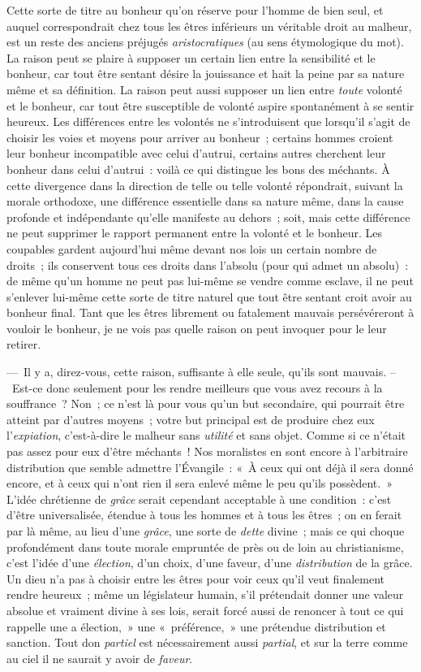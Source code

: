 \documentclass[french,twoside]{book} %
\begin{document}
Cette sorte de titre au bonheur qu’on réserve pour l’homme de bien seul, et auquel correspondrait chez tous les êtres inférieurs un véritable droit au malheur, est un reste des anciens préjugés \emph{aristocratiques} (au sens étymologique du mot). La raison peut se plaire à supposer un certain lien entre la sensibilité et le bonheur, car tout être sentant désire la jouissance et hait la peine par sa nature même et sa définition. La raison peut aussi supposer un lien entre \emph{toute} volonté et le bonheur, car tout être susceptible de volonté aspire spontanément à se sentir heureux. Les différences entre les volontés ne s’introduisent que lorsqu’il s’agit de choisir les voies et moyens pour arriver au bonheur ; certains hommes croient leur bonheur incompatible avec celui d’autrui, certains autres cherchent leur bonheur dans celui d’autrui : voilà ce qui distingue les bons des méchants. À cette divergence dans la direction de telle ou telle volonté répondrait, suivant la morale orthodoxe, une différence essentielle dans sa nature même, dans la cause profonde et indépendante qu’elle manifeste au dehors ; soit, mais cette différence ne peut supprimer le rapport permanent entre la volonté et le bonheur. Les coupables gardent aujourd’hui même devant nos lois un certain nombre de droits ; ils conservent tous ces droits dans l’absolu (pour qui admet un absolu) : de même qu’un homme ne peut pas lui-même se vendre comme esclave, il ne peut s’enlever lui-même cette sorte de titre naturel que tout être sentant croit avoir au bonheur final. Tant que les êtres librement ou fatalement mauvais persévéreront à vouloir le bonheur, je ne vois pas quelle raison on peut invoquer pour le leur retirer.\par
— Il y a, direz-vous, cette raison, suffisante à elle seule, qu’ils sont mauvais. – Est-ce donc seulement pour les rendre meilleurs que vous avez recours à la souffrance ? Non ; ce n’est là pour vous qu’un but secondaire, qui pourrait être atteint par d’autres moyens ; votre but principal est de produire chez eux l’\emph{expiation}, c’est-à-dire le malheur sans \emph{utilité} et sans objet. Comme si ce n’était pas assez pour eux d’être méchants ! Nos moralistes en sont encore à l’arbitraire distribution que semble admettre l’Évangile : « À ceux qui ont déjà il sera donné encore, et à ceux qui n’ont rien il sera enlevé même le peu qu’ils possèdent. » L’idée chrétienne de \emph{grâce} serait cependant acceptable à une condition : c’est d’être universalisée, étendue à tous les hommes et à tous les êtres ; on en ferait par là même, au lieu d’une \emph{grâce}, une sorte de \emph{dette} divine ; mais ce qui choque profondément dans toute morale empruntée de près ou de loin au christianisme, c’est l’idée d’une \emph{élection}, d’un choix, d’une faveur, d’une \emph{distribution} de la grâce. Un dieu n’a pas à choisir entre les êtres pour voir ceux qu’il veut finalement rendre heureux ; même un législateur humain, s’il prétendait donner une valeur absolue et vraiment divine à ses lois, serait forcé aussi de renoncer à tout ce qui rappelle une a élection, » une « préférence, » une prétendue distribution et sanction. Tout don \emph{partiel} est nécessairement aussi \emph{partial}, et sur la terre comme au ciel il ne saurait y avoir de \emph{faveur}.
\end{document}
